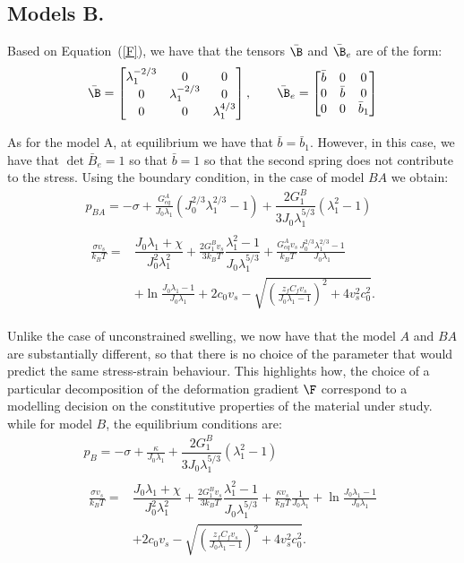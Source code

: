 \subsection{Models B.}
Based on Equation~(\ref{F}), we have that the tensors $\bar{\B}$ and $\bar{\B}_e$ are of the form:
\begin{equation}
\bar{\B}=\begin{bmatrix}
\lambda_1^{-2/3} &0&0\\
0&\lambda_1^{-2/3}&0\\
0&0& \lambda_1^{4/3}
\end{bmatrix}, \qquad
\bar{\B}_e=\begin{bmatrix}
\bar{b} &0&0\\
0&\bar{b}&0\\
0&0& \bar{b}_1
\end{bmatrix}
\end{equation}

As for the model A, at equilibrium we have that $\bar{b}=\bar{b}_1$. However, in this case, we have that $\det \bar{B}_e=1$ so that $\bar{b}=1$ so that the second spring does not contribute to the stress. Using the boundary condition, in the case of model $BA$ we obtain:
\begin{gather}
\displaystyle 
p_{BA} = -\sigma + \frac{G^A_{eq}}{J_0\lambda_1}(J_0^{2/3}\lambda_1^{2/3}-1)+\dfrac{2G^B_1}{3J_0\lambda_1^{5/3}} (\lambda_1^2-1) \\
\begin{aligned}
\frac{\sigma v_s}{k_B T}=&\dfrac{J_0\lambda_1+\chi}{J_0^2\lambda^2_1}+\frac{2G_1^Bv_s}{3k_BT} \dfrac{\lambda^2_1-1}{J_0 \lambda_1^{5/3}}+\frac{G^A_{eq}v_s}{k_BT}\frac{J_0^{2/3}\lambda_1^{2/3}-1}{J_0\lambda_1}\\[1.5mm]
& +\ln \frac{J_0\lambda_1-1}{J_0\lambda_1}+2c_0v_s-\sqrt{\left(\frac{z_fC_fv_s}{J_0\lambda_1-1}\right)^2+4v_s^2c^2_0}.\label{compAB}
\end{aligned}
\end{gather}

Unlike the case of unconstrained swelling, we now have that the model $A$ and $BA$ are substantially different, so that there is no choice of the parameter that would predict the same stress-strain behaviour. This highlights how, the choice of a particular decomposition of the deformation gradient $\F$ correspond to a modelling decision on the constitutive properties of the material under study.  
while for model $B$, the equilibrium conditions are:
\begin{gather}
\displaystyle 
p_B = -\sigma + \frac{\kappa}{J_0\lambda_1}+\dfrac{2G^B_1}{3J_0\lambda_1^{5/3}} (\lambda_1^2-1) \\
\begin{aligned}
\frac{\sigma v_s}{k_B T}=&\dfrac{J_0\lambda_1+\chi}{J_0^2\lambda^2_1}+\frac{2G_1^Bv_s}{3k_BT} \dfrac{\lambda^2_1-1}{J_0 \lambda_1^{5/3}}+\frac{\kappa v_s}{k_BT} \frac{1}{J_0 \lambda_1}+\ln \frac{J_0\lambda_1-1}{J_0\lambda_1}\\[1.5mm]
& +2c_0v_s-\sqrt{\left(\frac{z_fC_fv_s}{J_0\lambda_1-1}\right)^2+4v_s^2c^2_0}.
\end{aligned}
\end{gather}

